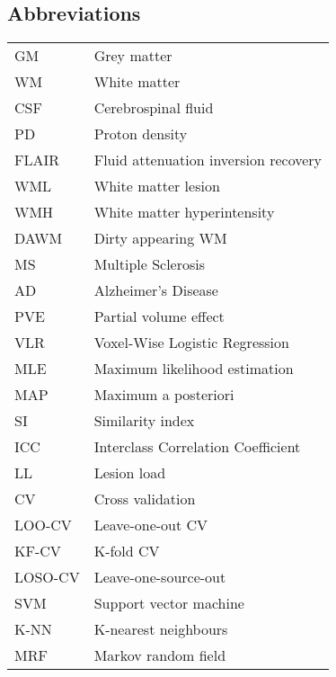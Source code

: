 \begin{singlespacing}
\tableofcontents
\newpage
\listoffigures
\newpage
\listoftables
\newpage
\subsection*{Abbreviations}
\begin{table}[H]
  \begin{tabu} to \textwidth{lX[l]}\hline
    GM      & Grey matter \\
    WM      & White matter \\
    CSF     & Cerebrospinal fluid \\
    PD      & Proton density \\
    FLAIR   & Fluid attenuation inversion recovery \\
    WML     & White matter lesion \\
    WMH     & White matter hyperintensity \\
    DAWM    & Dirty appearing WM \\
    MS      & Multiple Sclerosis \\ 
    AD      & Alzheimer's Disease \\
    PVE     & Partial volume effect \\
    VLR     & Voxel-Wise Logistic Regression \\
    MLE     & Maximum likelihood estimation \\
    MAP     & Maximum a posteriori \\
    SI      & Similarity index \\
    ICC     & Interclass Correlation Coefficient \\
    LL      & Lesion load \\
    CV      & Cross validation \\
    LOO-CV  & Leave-one-out CV \\
    KF-CV   & K-fold CV \\
    LOSO-CV & Leave-one-source-out \\
    SVM     & Support vector machine \\
    K-NN    & K-nearest neighbours \\
    MRF     & Markov random field \\
    \hline
  \end{tabu}
\end{table}
\end{singlespacing}
\clearpage
{}
\setcounter{page}{1}
